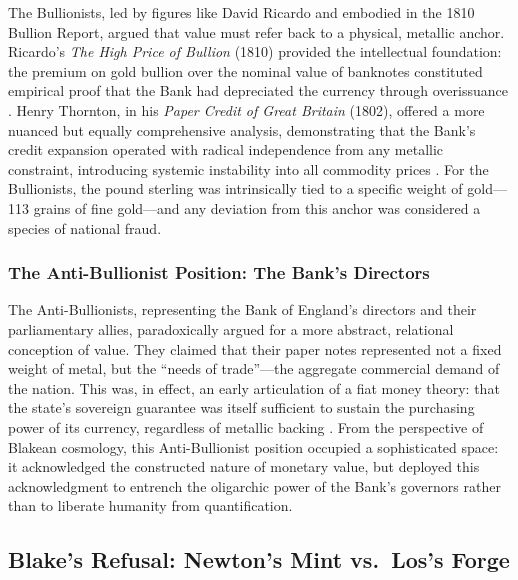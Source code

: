 \documentclass[
]{article}
\begin{document}
The Bullionists, led by figures like David Ricardo and embodied in the
1810 Bullion Report, argued that value must refer back to a physical,
metallic anchor. Ricardo's \emph{The High Price of Bullion} (1810)
provided the intellectual foundation: the premium on gold bullion over
the nominal value of banknotes constituted empirical proof that the Bank
had depreciated the currency through overissuance
\citep{ricardo1810high}. Henry Thornton, in his \emph{Paper Credit of
Great Britain} (1802), offered a more nuanced but equally comprehensive
analysis, demonstrating that the Bank's credit expansion operated with
radical independence from any metallic constraint, introducing systemic
instability into all commodity prices \citep{thornton1802nature}. For
the Bullionists, the pound sterling was intrinsically tied to a specific
weight of gold---113 grains of fine gold---and any deviation from this
anchor was considered a species of national fraud.

\subsubsection{The Anti-Bullionist Position: The Bank's
Directors}\label{the-anti-bullionist-position-the-banks-directors}

The Anti-Bullionists, representing the Bank of England's directors and
their parliamentary allies, paradoxically argued for a more abstract,
relational conception of value. They claimed that their paper notes
represented not a fixed weight of metal, but the ``needs of
trade''---the aggregate commercial demand of the nation. This was, in
effect, an early articulation of a fiat money theory: that the state's
sovereign guarantee was itself sufficient to sustain the purchasing
power of its currency, regardless of metallic backing
\citep{fetter1965development}. From the perspective of Blakean
cosmology, this Anti-Bullionist position occupied a sophisticated space:
it acknowledged the constructed nature of monetary value, but deployed
this acknowledgment to entrench the oligarchic power of the Bank's
governors rather than to liberate humanity from quantification.

\subsection{Blake's Refusal: Newton's Mint vs.~Los's
Forge}\label{blakes-refusal-newtons-mint-vs.-loss-forge}
\end{document}
